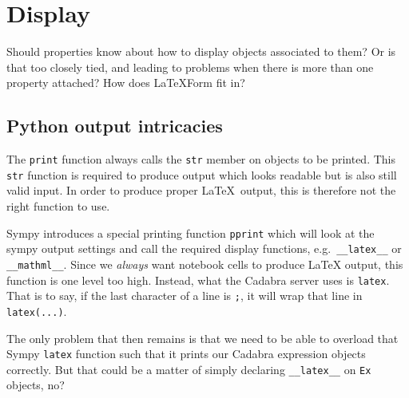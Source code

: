 
\section{Display}

Should properties know about how to display objects associated to
them? Or is that too closely tied, and leading to problems when there
is more than one property attached? How does LaTeXForm fit in?

\subsection{Python output intricacies}

The \verb|print| function always calls the \verb|str| member on
objects to be printed. This \verb|str| function is required to produce
output which looks readable but is also still valid input. In order to
produce proper \LaTeX{}~output, this is therefore not the right
function to use.

Sympy introduces a special printing function \verb|pprint| which will
look at the sympy output settings and call the required display
functions, e.g.~\verb|__latex__| or \verb|__mathml__|. Since we
\emph{always} want notebook cells to produce \LaTeX{} output, this
function is one level too high. Instead, what the Cadabra server uses
is \verb|latex|. That is to say, if the last character of a line is
\verb|;|, it will wrap that line in \verb|latex(...)|.

The only problem that then remains is that we need to be able to
overload that Sympy \verb|latex| function such that it prints our
Cadabra expression objects correctly. But that could be a matter of
simply declaring \verb|__latex__| on \verb|Ex| objects, no?
